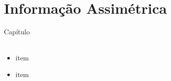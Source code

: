 \documentclass{beamer}[10]
\begin{document}
\begin{frame}
	\frametitle{}

	

\end{frame}

\section[I.Assimétrica]{Informação Assimétrica}
\begin{frame}
	\huge Capítulo \normalsize
	\\~\\
	\begin{itemize}
		\item item
		\item item
	\end{itemize}
\end{frame}


\begin{frame}
	\frametitle{}

	

\end{frame}
\end{document}
